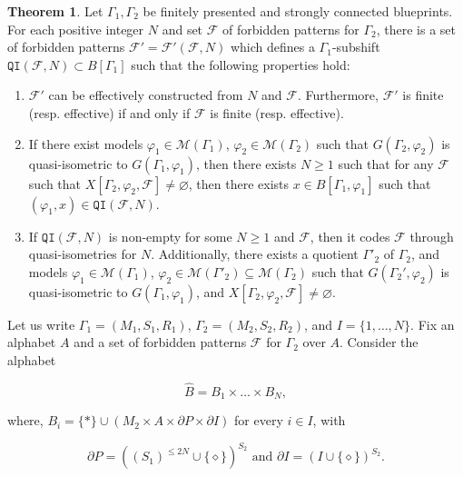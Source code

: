 \documentclass{article}
\theoremstyle{definition}
\newtheorem{theorem}{Theorem}[section] %
\theoremstyle{definition}
\newcommand{\M}{\mathcal{M}}
\newcommand{\FF}{\mathcal{F}}
\newcommand{\Fo}{\mathcal{F}}
\newcommand{\QI}{\mathtt{QI}}
\begin{document}
\begin{theorem}
\label{thm:QI}
Let $\Gamma_1,\Gamma_2$ be finitely presented and strongly connected blueprints. For each positive integer $N$ and set $\FF$ of forbidden patterns for $\Gamma_2$, there is a set of forbidden patterns $\Fo'=\Fo'(\FF,N)$ which defines a $\Gamma_1$-subshift $\QI(\FF,N)\subset B[\Gamma_1]$ such that the following properties hold:

\begin{enumerate}
    \item $\FF'$ can be effectively constructed from $N$ and $\FF$. Furthermore, $\Fo'$ is finite (resp. effective) if and only if $\FF$ is finite (resp. effective).
    \item If there exist models $\varphi_1\in\M(\Gamma_1)$, $\varphi_2\in\M(\Gamma_2)$ such that $G(\Gamma_2,\varphi_2)$ is quasi-isometric to $G(\Gamma_1, \varphi_1)$, then there exists $N \geq 1$ such that for any $\FF$ such that $X[\Gamma_2,\varphi_2,\Fo]\neq\varnothing$, then there exists $x\in B[\Gamma_1,\varphi_1]$ such that $(\varphi_1,x) \in \QI(\Fo,N)$. 
    \item If $\QI(\Fo,N)$ is non-empty for some $N \geq 1$ and $\Fo$, then it codes $\Fo$ through quasi-isometries for $N$. Additionally, there exists a quotient $\Gamma'_2$ of $\Gamma_2$, and models $\varphi_1\in\M(\Gamma_1)$, $\varphi_2\in\M(\Gamma'_2)\subseteq\M(\Gamma_2)$ such that $G(\Gamma_2',\varphi_2)$ is quasi-isometric to $G(\Gamma_1, \varphi_1)$, and $X[\Gamma_2,\varphi_2,\Fo]\neq\varnothing$.
    \end{enumerate}
\end{theorem}

Let us write $\Gamma_1 = (M_1, S_1, R_1)$, $\Gamma_2 = (M_2, S_2, R_2)$, and $I = \{1,\dots,N\}$. Fix an alphabet $A$ and a set of forbidden patterns $\FF$ for $\Gamma_2$ over $A$. Consider the alphabet 

    \[  \widehat{B} = B_1 \times \dots \times B_N, \]
   
where, $B_i = \{\ast\}\cup \left( M_2 \times A \times \partial P \times \partial I \right)$ for every $ i \in I$, with

     \[ \partial P = \left( (S_1)^{\leq 2N} \cup \{ \diamond \}  \right)^{S_2} \mbox{ and } \partial I = \left(I \cup \{ \diamond \}  \right)^{S_2}.  \]

\end{document}
